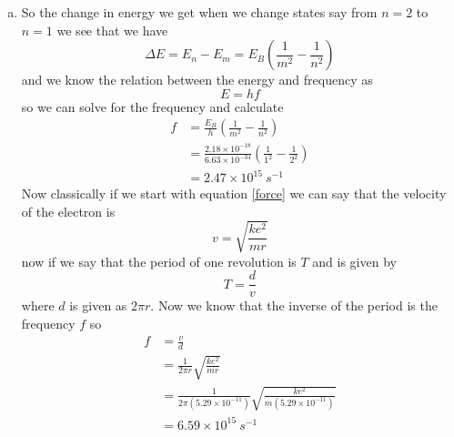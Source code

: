 \documentclass[11pt]{article}
\numberwithin{equation}{section}
\begin{document}
\begin{enumerate}[(a)]
\item
So the change in energy we get when we change states say from $n=2$ to $n=1$ we see that we have
$$\Delta E = E_n - E_m = E_B\left(\frac{1}{m^2} - \frac{1}{n^2}\right)$$
and we know the relation between the energy and frequency as
$$E = hf$$
so we can solve for the frequency and calculate
\begin{align*}
f &= \frac{E_B}{h}\left(\frac{1}{m^2} - \frac{1}{n^2}\right)\\
&= \frac{2.18\times10^{-18}}{6.63\times10^{-34}}\left(\frac{1}{1^2} - \frac{1}{2^2}\right)\\
&= 2.47\times10^{15}\ s^{-1}
\end{align*}
Now classically if we start with equation \ref{force} we can say that the velocity of the electron is 
$$v = \sqrt{\frac{ke^2}{mr}}$$
now if we say that the period of one revolution is $T$ and is given by
$$T = \frac{d}{v}$$
where $d$ is given as $2\pi r$. Now we know that the inverse of the period is the frequency $f$ so 
\begin{align*}
f &= \frac{v}{d}\\
&= \frac{1}{2\pi r}\sqrt{\frac{ke^2}{mr}}\\
&= \frac{1}{2\pi (5.29\times10^{-11})}\sqrt{\frac{ke^2}{m(5.29\times10^{-11})}}\\
&= 6.59\times10^{15}\ s^{-1}
\end{align*}

\end{enumerate}
\end{document}
